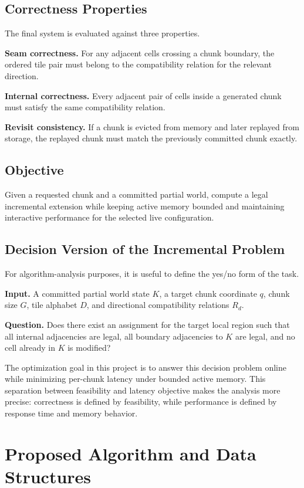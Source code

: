\documentclass[12pt,a4paper]{report}
\begin{document}
\section{Correctness Properties}
The final system is evaluated against three properties.

\textbf{Seam correctness.} For any adjacent cells crossing a chunk boundary, the ordered tile pair must belong to the compatibility relation for the relevant direction.

\textbf{Internal correctness.} Every adjacent pair of cells inside a generated chunk must satisfy the same compatibility relation.

\textbf{Revisit consistency.} If a chunk is evicted from memory and later replayed from storage, the replayed chunk must match the previously committed chunk exactly.

\section{Objective}
Given a requested chunk and a committed partial world, compute a legal incremental extension while keeping active memory bounded and maintaining interactive performance for the selected live configuration.

\section{Decision Version of the Incremental Problem}
For algorithm-analysis purposes, it is useful to define the yes/no form of the task.

\textbf{Input.} A committed partial world state $K$, a target chunk coordinate $q$, chunk size $G$, tile alphabet $D$, and directional compatibility relations $R_d$.

\textbf{Question.} Does there exist an assignment for the target local region such that all internal adjacencies are legal, all boundary adjacencies to $K$ are legal, and no cell already in $K$ is modified?

The optimization goal in this project is to answer this decision problem online while minimizing per-chunk latency under bounded active memory. This separation between feasibility and latency objective makes the analysis more precise: correctness is defined by feasibility, while performance is defined by response time and memory behavior.

\chapter{Proposed Algorithm and Data Structures}
\end{document}
